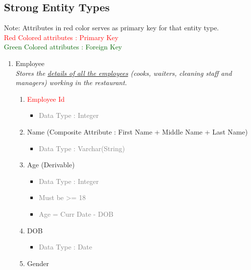 \subsection{Strong Entity Types}
Note: Attributes in red color serves as primary key for that entity type. \\
\textcolor{red}{Red Colored attributes : Primary Key} \\
\textcolor{darkgreen}{Green Colored attributes : Foreign Key}
    \begin{enumerate}
        \item Employee \\
        \textit{Stores the \underline{details of all the employees} (cooks, waiters, cleaning staff and managers) working in the restaurant.}
            \begin{enumerate}[label=\alph*.]
                \item\textcolor{red}{Employee Id}
                    \begin{itemize}[label=-]
                        \item \textcolor{gray}{Data Type : Integer}
                    \end{itemize}
                \item Name (Composite Attribute : First Name + Middle Name + Last Name)
                    \begin{itemize}[label=-]
                        \item \textcolor{gray}{Data Type : Varchar(String)}
                    \end{itemize}
                \item Age (Derivable)
                    \begin{itemize}[label=-]
                        \item \textcolor{gray}{Data Type : Integer}
                        \item \textcolor{gray}{Must be >= 18}
                        \item \textcolor{gray}{Age = Curr Date - DOB}
                    \end{itemize}
                \item DOB
                    \begin{itemize}[label=-]
                        \item \textcolor{gray}{Data Type : Date}
                    \end{itemize}
                \item Gender
                    \begin{itemize}[label=-]

\end{itemize}
\end{enumerate}
\end{enumerate}
